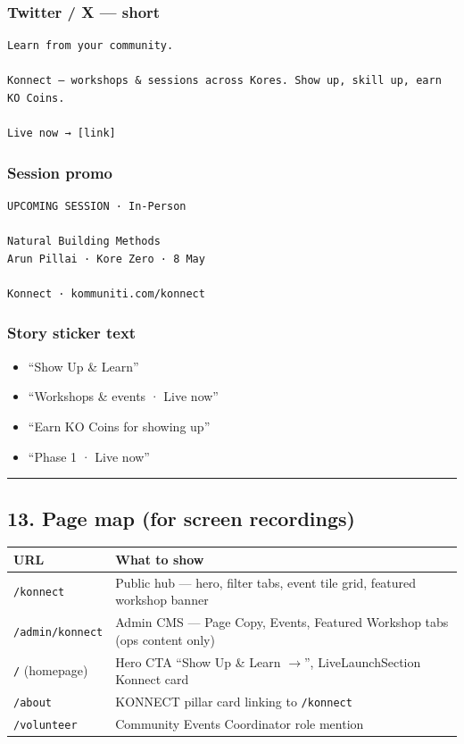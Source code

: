 \documentclass[11pt,a4paper]{report}
\begin{document}
\subsubsection{Twitter / X --- short}
\begin{verbatim}
Learn from your community.

Konnect — workshops & sessions across Kores. Show up, skill up, earn KO Coins.

Live now → [link]
\end{verbatim}

\subsubsection{Session promo}
\begin{verbatim}
UPCOMING SESSION · In-Person

Natural Building Methods
Arun Pillai · Kore Zero · 8 May

Konnect · kommuniti.com/konnect
\end{verbatim}

\subsubsection{Story sticker text}
\begin{itemize}
  \item “Show Up \& Learn”
  \item “Workshops \& events · Live now”
  \item “Earn KO Coins for showing up”
  \item “Phase 1 · Live now”
\end{itemize}

\medskip\hrule\medskip

\subsection{13. Page map (for screen recordings)}

\begin{longtable}{|l|l|}
\hline
URL & What to show \\ \hline
\texttt{/konnect} & Public hub --- hero, filter tabs, event tile grid, featured workshop banner \\ \hline
\texttt{/admin/konnect} & Admin CMS --- Page Copy, Events, Featured Workshop tabs (ops content only) \\ \hline
\texttt{/} (homepage) & Hero CTA “Show Up \& Learn $\rightarrow$”, LiveLaunchSection Konnect card \\ \hline
\texttt{/about} & KONNECT pillar card linking to \texttt{/konnect} \\ \hline
\texttt{/volunteer} & Community Events Coordinator role mention \\
\hline
\end{longtable}
\end{document}
